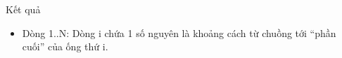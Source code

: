 Kết quả
\begin{itemize}
	\item     Dòng 1..N: Dòng i chứa 1 số nguyên là khoảng            cách từ chuồng tới “phần cuối” của ống thứ i.   
\end{itemize}